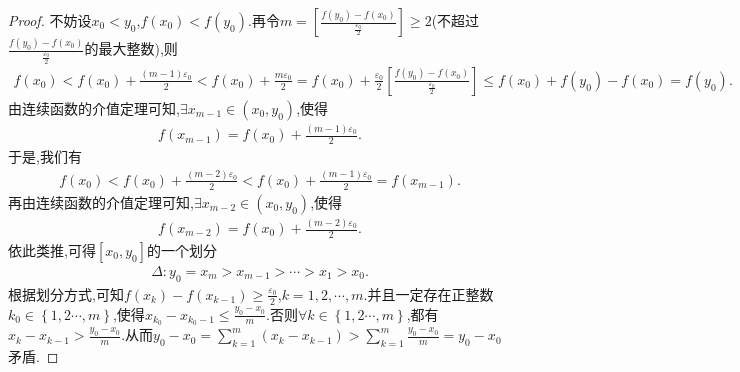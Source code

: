 \documentclass[lang=cn,newtx,10pt,scheme=chinese]{elegantbook}
\begin{document}
\begin{proof}
        不妨设\(x_0<y_0\),\(f\left( x_0 \right) <f\left( y_0 \right)\).再令\(m=\left[ \frac{f\left( y_0 \right) -f\left( x_0 \right)}{\frac{\varepsilon _0}{2}} \right] \geq 2\)(不超过\(\frac{f\left( y_0 \right) -f\left( x_0 \right)}{\frac{\varepsilon _0}{2}}\)的最大整数),则
        \begin{align*}
            f\left( x_0 \right) <f\left( x_0 \right) +\frac{\left( m - 1 \right) \varepsilon _0}{2}<f\left( x_0 \right) +\frac{m\varepsilon _0}{2}=f\left( x_0 \right) +\frac{\varepsilon _0}{2}\left[ \frac{f\left( y_0 \right) -f\left( x_0 \right)}{\frac{\varepsilon _0}{2}} \right] \leqslant f\left( x_0 \right) +f\left( y_0 \right) -f\left( x_0 \right) =f\left( y_0 \right).
        \end{align*}
        由连续函数的介值定理可知,\(\exists x_{m - 1}\in \left( x_0,y_0 \right)\),使得
        \begin{align*}
           f\left( x_{m - 1} \right) =f\left( x_0 \right) +\frac{\left( m - 1 \right) \varepsilon _0}{2}.
        \end{align*}
        于是,我们有
        \begin{align*}
            f\left( x_0 \right) <f\left( x_0 \right) +\frac{\left( m - 2 \right) \varepsilon _0}{2}<f\left( x_0 \right) +\frac{\left( m - 1 \right) \varepsilon _0}{2}=f\left( x_{m - 1} \right).
        \end{align*}
        再由连续函数的介值定理可知,\(\exists x_{m - 2}\in \left( x_0,y_0 \right)\),使得
        \begin{align*}
            f\left( x_{m - 2} \right) =f\left( x_0 \right) +\frac{\left( m - 2 \right) \varepsilon _0}{2}.
        \end{align*}
        依此类推,可得\(\left[ x_0,y_0 \right]\)的一个划分
        \begin{align*}
            \Delta :y_0=x_m>x_{m - 1}>\cdots >x_1>x_0.
        \end{align*}
        根据划分方式,可知\(f\left( x_k \right) -f\left( x_{k - 1} \right) \geq \frac{\varepsilon _0}{2}\),\(k = 1,2,\cdots,m\).并且一定存在正整数\(k_0\in \left\{ 1,2\cdots,m \right\}\),使得\(x_{k_0}-x_{k_0 - 1}\leq \frac{y_0 - x_0}{m}\).否则\(\forall k\in \left\{ 1,2\cdots,m \right\}\),都有\(x_k - x_{k - 1}>\frac{y_0 - x_0}{m}\).从而\(y_0 - x_0=\sum_{k = 1}^m{\left( x_k - x_{k - 1} \right)}>\sum_{k = 1}^m{\frac{y_0 - x_0}{m}} = y_0 - x_0\)矛盾.
        

\end{proof}
\end{document}
